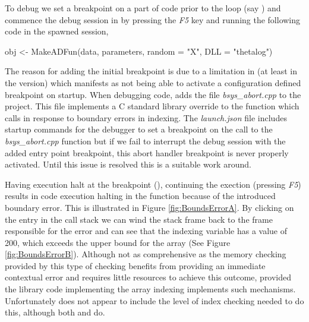 To debug we set a breakpoint on a part of code prior to the loop (say ) and commence 
the debug session in  by pressing the \emph{F5} key and running the following  code 
in the spawned  session,

\begin{Schunk}
  \begin{Sinput}
    obj <- MakeADFun(data, parameters, random = "X", DLL = "thetalog")
  \end{Sinput}
\end{Schunk}

The reason for adding the initial breakpoint is due to a limitation in (at least in the  version)  which manifests as not 
being able to activate a configuration defined breakpoint on startup. When debugging  code,  adds the file \emph{bsys\_abort.cpp}
to the project. This file implements a C standard library override to the  function which  calls in response to 
boundary errors in indexing. The \emph{launch.json} file includes startup commands for the debugger to set a breakpoint on the call to 
the \emph{bsys\_abort.cpp} function but if we fail to interrupt the debug session with the added entry point breakpoint, this 
abort handler breakpoint is never properly activated. Until this issue is resolved this is a suitable work around. 

Having execution halt at the breakpoint (), continuing the exection (pressing \emph{F5}) results in code execution halting in the 
function because of the introduced boundary error. This is illustrated in Figure \ref{fig:BoundsErrorA}. By clicking on the  entry
in the call stack we can wind the stack frame back to the frame responsible for the error and can see that the  indexing variable has a value
of 200, which exceeds the upper bound for the  array (See Figure \ref{fig:BoundsErrorB}). Although not as comprehensive as the memory checking 
provided by  this type of checking benefits from providing an immediate contextual error and requires little resources to achieve this outcome, provided 
the library code implementing the array indexing implements such mechanisms. Unfortunately  does not appear to include the level of 
index checking needed to do this, although both  and  do. 

